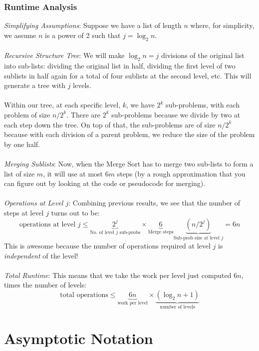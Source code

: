 \documentclass[a4paper,12pt]{scrartcl}
\begin{document}
\subsubsection{Runtime Analysis}
{\sl Simplifying Assumptions}:
    Suppose we have a list of length
    $n$ where, for simplicity, we assume $n$ is a
    power of 2 such that $j = \log_2 n$. 
    \\
    \\
{\sl Recursive Structure Tree}:
    We will make $\log_2 n = j$ divisions of 
    the original list into sub-lists: dividing the original
    list in half, dividing the first level of two sublists in
    half again for a total of four sublists at the second
    level, etc. This will generate a tree with $j$ levels.
    \\
    \\
    Within our tree, at each specific level, $k$, we have 
    $2^k$ sub-problems, with each problem of size
    $n/2^k$.  There are $2^k$ sub-problems because
    we divide by two at each step down the tree.
    On top of that, the sub-problems are
    of size $n/2^k$ because with each division of a 
    parent problem, we reduce the size of the problem 
    by one half.
    \\
    \\
{\sl Merging Sublists}:
    Now, when the Merge Sort has to merge two sub-lists 
    to form a list of size $m$, it will use at most
    $6m$ steps (by a rough approximation that you
    can figure out by looking at the code or pseudocode
    for merging).
    \\
    \\
{\sl Operations at Level $j$}:
    Combining previous results, we see that the number of 
    steps at level $j$ turns out to be:
    \[ \text{operations at level $j$} \leq 
	\underbrace{2^j}_{\text{No. of level $j$ sub-probs}} 
	\times \underbrace{6}_{\text{Merge steps}}
	\underbrace{\left(n/2^j\right)}_{\text{Sub-prob size
	at level $j$}} = 6n \]
    This is awesome because the number of operations
    required at level $j$ is \emph{independent} of the level!
    \\
    \\
{\sl Total Runtime}:
    This means that we take the work per level just computed
    $6n$, times the number of levels:
    \[ \text{total operations} \leq \underbrace{6n}_{\text{work per level}}
	\times \underbrace{\left( \log_2 n +1\right)}_{\text{number of levels}}
	\]


    
\section{Asymptotic Notation}
\end{document}
